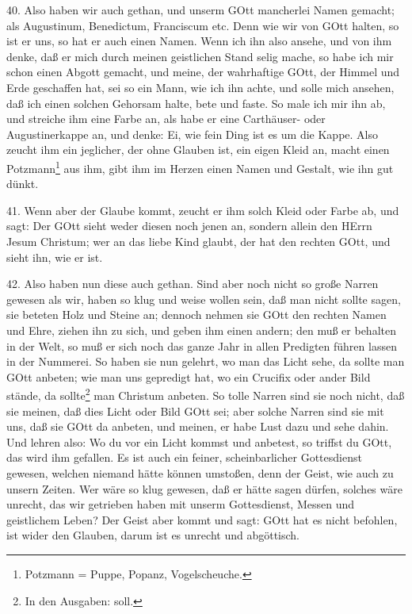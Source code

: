 40. Also haben wir auch gethan, und unserm GOtt mancherlei Namen gemacht; als Augustinum, Benedictum, Franciscum etc. Denn wie wir von GOtt halten, so ist er uns, so hat er auch einen Namen. Wenn ich ihn also ansehe, und von ihm denke, daß er mich durch meinen geistlichen Stand selig mache, so habe ich mir schon einen Abgott gemacht, und meine, der wahrhaftige GOtt, der Himmel und Erde geschaffen hat, sei so ein Mann, wie ich ihn achte, und solle mich ansehen, daß ich einen solchen Gehorsam halte, bete und faste. So male ich mir ihn ab, und streiche ihm eine Farbe an, als habe er eine Carthäuser- oder Augustinerkappe an, und denke: Ei, wie fein Ding ist es um die Kappe. Also zeucht ihm ein jeglicher, der ohne Glauben ist, ein eigen Kleid an, macht einen Potzmann\footnote{Potzmann = Puppe, Popanz, Vogelscheuche.} aus ihm, gibt ihm im Herzen einen Namen und Gestalt, wie ihn gut dünkt.

41. Wenn aber der Glaube kommt, zeucht er ihm solch Kleid oder Farbe ab, und sagt: Der GOtt sieht weder diesen noch jenen an, sondern allein den HErrn Jesum Christum; wer an das liebe Kind glaubt, der hat den rechten GOtt, und sieht ihn, wie er ist.

42. Also haben nun diese auch gethan. Sind aber noch nicht so große Narren gewesen als wir, haben so klug und weise wollen sein, daß man nicht sollte sagen, sie beteten Holz und Steine an; dennoch nehmen sie GOtt den rechten Namen und Ehre, ziehen ihn zu sich, und geben ihm einen andern; den muß er behalten in der Welt, so muß er sich noch das ganze Jahr in allen Predigten führen lassen in der Nummerei. So haben sie nun gelehrt, wo man das Licht sehe, da sollte man GOtt anbeten; wie man uns gepredigt hat, wo ein Crucifix oder ander Bild stände, da sollte\footnote{In den Ausgaben: soll.} man Christum anbeten. So tolle Narren sind sie noch nicht, daß sie meinen, daß dies Licht oder Bild GOtt sei; aber solche Narren sind sie mit uns, daß sie GOtt da anbeten, und meinen, er habe Lust dazu und sehe dahin. Und lehren also: Wo du vor ein Licht kommst und anbetest, so triffst du GOtt, das wird ihm gefallen. Es ist auch ein feiner, scheinbarlicher Gottesdienst gewesen, welchen niemand hätte können umstoßen, denn der Geist, wie auch zu unsern Zeiten. Wer wäre so klug gewesen, daß er hätte sagen dürfen, solches wäre unrecht, das wir getrieben haben mit unserm Gottesdienst, Messen und geistlichem Leben? Der Geist aber kommt und sagt: GOtt hat es nicht befohlen, ist wider den Glauben, darum ist es unrecht und abgöttisch.

